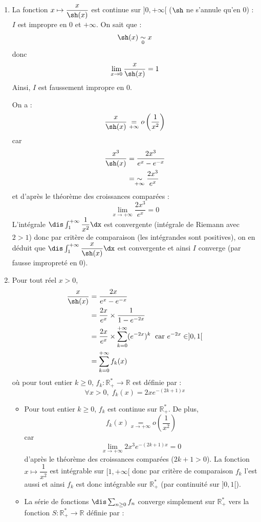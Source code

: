 \documentclass[a4paper,10pt]{report}
\begin{document}
\begin{enumerate}
\item La fonction $x \mapsto \dfrac{x}{\sh(x)}$ est continue sur $]0, + \infty[$ ($\sh$ ne s'annule qu'en $0$) : $I$ est impropre en $0$ et $+ \infty$. On sait que :
$$ \sh(x) \underset{0}{\sim} x$$
donc 
$$ \lim_{x \rightarrow 0} \dfrac{x}{\sh(x)} = 1$$
Ainsi, $I$ est faussement impropre en $0$. 

\medskip

\noindent On a :
$$ \dfrac{x}{\sh(x)}  \underset{+ \infty}{=} o \left( \dfrac{1}{x^2} \right)$$
car 
\begin{align*}
\dfrac{x^3}{\sh(x)} & = \dfrac{2x^3}{e^{x}-e^{-x}} \\
& = \underset{+ \infty}{\sim} \dfrac{2x^3}{e^{x}} \\
\end{align*}
et d'après le théorème des croissances comparées :
$$ \lim_{x \rightarrow + \infty} \dfrac{2x^3}{e^{x}} = 0$$
L'intégrale $\dis \int_1^{+ \infty} \dfrac{1}{x^2} \dx$ est convergente (intégrale de Riemann avec $2>1$) donc par critère de comparaison (les intégrandes sont positives), on en déduit que $\dis \int_1^{+ \infty} \dfrac{x}{\sh(x)} \dx$ est convergente et ainsi $I$ converge (par fausse impropreté en $0$).
\item Pour tout réel $x>0$,
\begin{align*}
\dfrac{x}{\sh(x)} & = \dfrac{2x}{e^x-e^{-x}} \\
& = \dfrac{2x}{e^x} \times \dfrac{1}{1-e^{-2x}} \\
& =  \dfrac{2x}{e^x} \times \sum_{k=0}^{+ \infty} (e^{-2x})^k \; \hbox{ car } e^{-2x} \in ]0,1[ \\
& = \sum_{k=0}^{+ \infty} f_k(x)
\end{align*}
où pour tout entier $k \geq 0$, $f_k : \mathbb{R}_+^* \rightarrow \mathbb{R}$ est définie par :
$$ \forall x>0, \; f_k(x) = 2x e^{-(2k+1)x} $$
\begin{itemize}
\item Pour tout entier $k \geq 0$, $f_k$ est continue sur $\mathbb{R}_+^*$. De plus,
$$ f_k(x) \underset{x \rightarrow + \infty}{=} o \left( \dfrac{1}{x^2} \right)$$
car 
$$ \lim_{x \rightarrow + \infty} 2x^3 e^{-(2k+1)x} = 0$$
d'après le théorème des croissances comparées ($2k+1>0$). La fonction $x \mapsto \dfrac{1}{x^2}$ est intégrable sur $[1, + \infty[$ donc par critère de comparaison $f_k$ l'est aussi et ainsi $f_k$ est donc intégrable sur $\mathbb{R}_+^*$ (par continuité sur $]0,1[$). 
\item La série de fonctions $\dis \sum_{n \geq 0} f_n$ converge simplement sur $\mathbb{R}_+^*$ vers la fonction $S : \mathbb{R}_+^* \rightarrow \mathbb{R}$ définie par :

\end{itemize}
\end{enumerate}
\end{document}
